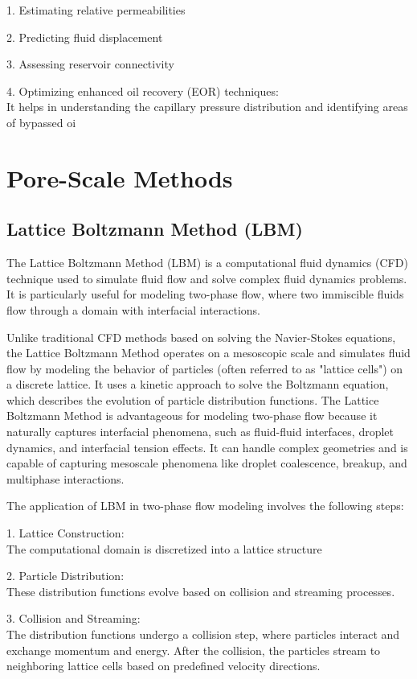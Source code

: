 \documentclass[letterpaper,12pt]{article}
\begin{document}
	1. Estimating relative permeabilities
	
	2. Predicting fluid displacement
	
	3. Assessing reservoir connectivity
	
	4. Optimizing enhanced oil recovery (EOR) techniques: \\
		 It helps in understanding the capillary pressure distribution and identifying areas of bypassed oi
	\section{Pore-Scale Methods}
	

	\subsection {Lattice Boltzmann Method (LBM)}
		

	The Lattice Boltzmann Method (LBM) is a computational fluid dynamics (CFD) technique used to simulate fluid flow and solve complex fluid dynamics problems. It is particularly useful for modeling two-phase flow, where two immiscible fluids flow through a domain with interfacial interactions.
	
	Unlike traditional CFD methods based on solving the Navier-Stokes equations, the Lattice Boltzmann Method operates on a mesoscopic scale and simulates fluid flow by modeling the behavior of particles (often referred to as "lattice cells") on a discrete lattice. It uses a kinetic approach to solve the Boltzmann equation, which describes the evolution of particle distribution functions.
	The Lattice Boltzmann Method is advantageous for modeling two-phase flow because it naturally captures interfacial phenomena, such as fluid-fluid interfaces, droplet dynamics, and interfacial tension effects. It can handle complex geometries and is capable of capturing mesoscale phenomena like droplet coalescence, breakup, and multiphase interactions.
	
	The application of LBM in two-phase flow modeling involves the following steps:
	
	1. Lattice Construction:\\
	 	The computational domain is discretized into a lattice structure
	
	2. Particle Distribution:\\
		 These distribution functions evolve based on collision and streaming processes.
	
	3. Collision and Streaming:\\
		 The distribution functions undergo a collision step, where particles interact and exchange momentum and energy. After the collision, the particles stream to neighboring lattice cells based on predefined velocity directions.
	
\end{document}
